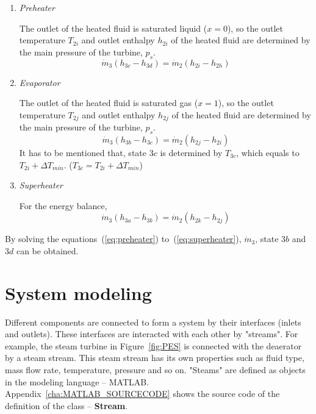 \begin{enumerate}[label=(\arabic*)]
  \item \emph{Preheater}
  
  The outlet of the heated fluid is saturated liquid ($x = 0$), so the outlet temperature $T_{2i}$ and outlet enthalpy $h_{2i}$ of the heated fluid are determined by the main pressure of the turbine, $p_s$.
  \begin{equation}
  \dot{m}_3 (h_{3c}-h_{3d})=\dot{m}_2 (h_{2i} - h_{2h})
  \label{eq:preheater}
\end{equation}

  \item \emph{Evaporator}
  
  The outlet of the heated fluid is saturated gas ($x = 1$), so the outlet temperature $T_{2j}$ and outlet enthalpy $h_{2j}$ of the heated fluid are determined by the main pressure of the turbine, $p_s$.
  \begin{equation}
  \dot{m}_3 (h_{3b}-h_{3c})=\dot{m}_2 (h_{2j} - h_{2i})
  \label{eq:evaporator}
\end{equation}
	It has to be mentioned that, state $3c$ is determined by $T_{3c}$, which equals to $T_{2i} + \Delta T_{min}$. ($T_{3c} = T_{2i} + \Delta T_{min}$)
  
  \item \emph{Superheater}
  
  For the energy balance,
  \begin{equation}
  \dot{m}_3 (h_{3a}-h_{3b})=\dot{m}_2 (h_{2k} - h_{2j})
  \label{eq:superheater}
\end{equation}
	  
\end{enumerate}

By solving the equations~(\ref{eq:preheater}) to~(\ref{eq:superheater}), $\dot{m}_3$, state $3b$ and $3d$ can be obtained.

\section{System modeling}

Different components are connected to form a system by their interfaces (inlets and outlets). These interfaces are interacted with each other by "streams". For example, the steam turbine in Figure~\ref{fig:PES} is connected with the deaerator by a steam stream. This steam stream has its own properties such as fluid type, mass flow rate, temperature, pressure and so on.
"Steams" are defined as objects in the modeling language -- MATLAB. Appendix~\ref{cha:MATLAB_SOURCECODE} shows the source code of the definition of the class -- \textbf{Stream}.

